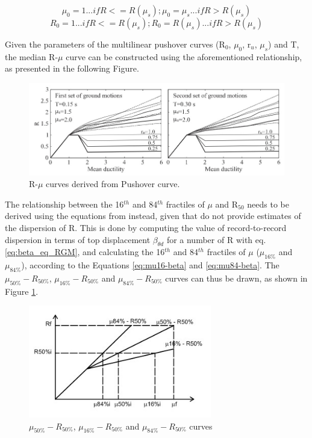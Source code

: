 \begin{equation}
\mu_0= 1 ... if R<=R(\mu_s); \mu_0 = \mu_s ... if R>R(\mu_s)
\end{equation}
\begin{equation}
R_0= 1 ... if R<=R(\mu_s); R_0 = R(\mu_s) ... if R>R(\mu_s)
\end{equation}

Given the parameters of the multilinear pushover curves (R$_{0}$, $\mu_{0}$, r$_{u}$, $\mu_s$) and T, the median R-$\mu$ curve can be constructed using the aforementioned relationship, as presented in the following Figure.
 
\begin{figure}[!htbp]
\centering
\includegraphics[width=15cm]{./figures/DF_R-mu.jpg}
\caption{R-$\mu$ curves derived from Pushover curve.}
\end{figure}

The relationship between the 16$^{th}$ and 84$^{th}$ fractiles of $\mu$ and R$_{50}$ needs to be derived using the equations from \citep{RuizGarciaMiranda2007} instead, given that \citep{DolsekFajfar2004} do not provide estimates of the dispersion of R. This is done by computing the value of record-to-record dispersion in terms of top displacement $\beta_{\theta d}$ for a number of R with eq. \ref{eq:beta_eq_RGM}, and calculating the 16$^{th}$ and 84$^{th}$ fractiles of $\mu$ ($\mu_{16\%}$ and $\mu_{84\%}$), according to the Equations \ref{eq:mu16-beta} and \ref{eq:mu84-beta}. The $\mu_{50\%}-R_{50\%}$, $\mu_{16\%}-R_{50\%}$ and $\mu_{84\%}-R_{50\%}$ curves can thus be drawn, as shown in Figure \ref{fig:R-mu}.

\begin{figure}[!htbp]
\centering
\includegraphics[width=8cm]{./figures/Rmu.jpg}
\caption{$\mu_{50\%}-R_{50\%}$, $\mu_{16\%}-R_{50\%}$ and $\mu_{84\%}-R_{50\%}$ curves}
\label{fig:R-mu}
\end{figure}

